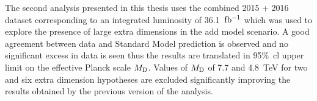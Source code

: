 The second analysis presented in this thesis uses the combined 2015 + 2016
dataset corresponding to an integrated luminosity of 36.1~$\mbox{fb$^{-1}$}$ which was used
to explore the presence of large extra dimensions in the \gls{add} model
scenario. A good agreement between data and Standard Model prediction is
observed and no significant excess in data is seen thus the results are
translated in 95\%~\gls{cl} upper limit on the effective Planck scale
$M_\mathrm{D}$. Values of $M_\mathrm{D}$ of 7.7 and 4.8~TeV for two and six extra dimension
hypotheses are excluded significantly improving the results obtained by the
previous version of the analysis.
